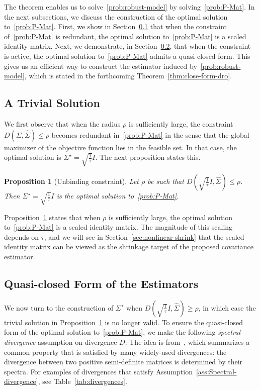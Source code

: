 \documentclass[11pt]{article}
\newtheorem{proposition}{Proposition}
\newcommand{\opt}{^\star}
\newcommand{\wh}{\widehat}
\newcommand{\covsa}{\wh \Sigma}
\begin{document}
The theorem enables us to solve~\eqref{prob:robust-model} by solving~\eqref{prob:P-Mat}. In the next subsections, we discuss the construction of the optimal solution to~\eqref{prob:P-Mat}. 
First, we show in Section~\ref{sec:trivial-sol} that when the constraint of~\eqref{prob:P-Mat} is redundant, the optimal solution to~\eqref{prob:P-Mat} is a scaled identity matrix. Next, we demonstrate, in Section~\ref{sec:assump},
that when the constraint is active, the optimal solution to~\eqref{prob:P-Mat} admits a quasi-closed form. 
This gives us an efficient way to construct the estimator induced by~\eqref{prob:robust-model}, which is stated in the forthcoming Theorem~\ref{thm:close-form-dro}.


\subsection{A Trivial Solution}\label{sec:trivial-sol}

We first observe that when the radius $ \rho$ is sufficiently large, the constraint $D(\Sigma, \covsa) \le  \rho$ becomes redundant in~\eqref{prob:P-Mat} in the sense that the global maximizer of the objective function lies in the feasible set. In that case, the optimal solution is  $\Sigma\opt=\sqrt{\frac{1}{\tau}} I$. The next proposition states this.



\begin{proposition}[Unbinding constraint] \label{prop:unbinding}
    Let  $\rho$ be such that
    $D\left(\sqrt{\frac{1}{\tau}} I, \covsa \right)\leq  \rho$. Then $\Sigma\opt=\sqrt{\frac{1}{\tau}} I$ is the optimal solution to~\eqref{prob:P-Mat}.
\end{proposition}

Proposition~\ref{prop:unbinding} states that when $ \rho$ is sufficiently large, 
the optimal solution to~\eqref{prob:P-Mat} is a scaled identity matrix. The magnitude of this scaling depends on $\tau$, and we will see in Section~\ref{sec:nonlinear-shrink} that the scaled identity matrix can be viewed as the shrinkage target of the proposed covariance estimator. 

\subsection{Quasi-closed Form of the Estimators}\label{sec:assump}

We now turn to the construction of $\Sigma\opt$ when $D(\sqrt{\frac{1}{\tau}} I, \covsa ) \geq  \rho$, in which case the trivial solution in Proposition~\ref{prop:unbinding} is no longer valid. 
To ensure the quasi-closed form of the optimal solution to~\eqref{prob:P-Mat}, we make the following {\it spectral divergence} assumption on divergence $D$. The idea is from~\citet[Assumption 2]{ref:yue2024geometric}, which summarizes a common property that is satisfied by many widely-used divergences: the divergence between two positive semi-definite matrices is determined by their spectra. 
For examples of divergences that satisfy Assumption~\ref{ass:Spectral-divergence}, see Table~\ref{tab:divergences}.
\end{document}
